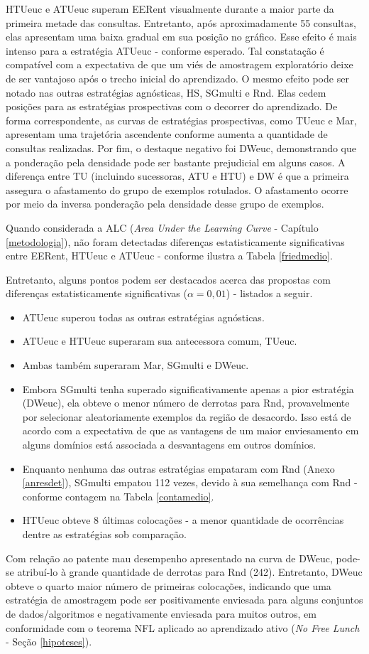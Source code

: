 HTUeuc e ATUeuc superam EERent visualmente durante a maior parte da primeira metade das consultas.
Entretanto, após aproximadamente 55 consultas, elas apresentam uma baixa gradual em sua posição no gráfico.
Esse efeito é mais intenso para a estratégia ATUeuc - conforme esperado.
Tal constatação é compatível com a expectativa de que um viés de amostragem exploratório deixe de ser vantajoso após o trecho inicial do aprendizado.
O mesmo efeito pode ser notado nas outras estratégias agnósticas, HS, SGmulti e Rnd.
Elas cedem posições para as estratégias prospectivas com o decorrer do aprendizado.
De forma correspondente, as curvas de estratégias prospectivas, como TUeuc e Mar, apresentam uma trajetória ascendente conforme aumenta a quantidade de consultas realizadas.
Por fim, o destaque negativo foi DWeuc, demonstrando que a ponderação pela densidade pode ser bastante prejudicial em alguns casos.
A diferença entre TU (incluindo sucessoras, ATU e HTU) e DW é que a primeira assegura o afastamento do grupo de exemplos rotulados.
O afastamento ocorre por meio da inversa ponderação pela densidade desse grupo de exemplos.

Quando considerada a ALC (\textit{Area Under the Learning Curve} - Capítulo \ref{metodologia}), não foram detectadas diferenças estatisticamente significativas entre EERent, HTUeuc e ATUeuc - conforme ilustra a Tabela \ref{friedmedio}.

Entretanto, alguns pontos podem ser destacados acerca das propostas com diferenças estatisticamente significativas ($\alpha=0,01$) - listados a seguir.
\begin{itemize}
   \item ATUeuc superou todas as outras estratégias agnósticas.
   \item ATUeuc e HTUeuc superaram sua antecessora comum, TUeuc.
   \item Ambas também superaram Mar, SGmulti e DWeuc.
   \item Embora SGmulti tenha superado significativamente apenas a pior estratégia (DWeuc), ela obteve o menor número de derrotas para Rnd, provavelmente por selecionar aleatoriamente exemplos da região de desacordo. Isso está de acordo com a expectativa de que as vantagens de um maior enviesamento em alguns domínios está associada a desvantagens em outros domínios.
   \item Enquanto nenhuma das outras estratégias empataram com Rnd (Anexo \ref{anresdet}), SGmulti empatou 112 vezes, devido à sua semelhança com Rnd - conforme contagem na Tabela \ref{contamedio}.
   \item HTUeuc obteve 8 últimas colocações - a menor quantidade de ocorrências dentre as estratégias sob comparação.
\end{itemize}
Com relação ao patente mau desempenho apresentado na curva de DWeuc, pode-se atribuí-lo à grande quantidade de derrotas para Rnd (242).
Entretanto, DWeuc obteve o quarto maior número de primeiras colocações, indicando que uma estratégia de amostragem pode ser positivamente enviesada para alguns conjuntos de dados/algoritmos e negativamente enviesada para muitos outros, em conformidade com o teorema NFL aplicado ao aprendizado ativo (\textit{No Free Lunch} - Seção \ref{hipoteses}).

